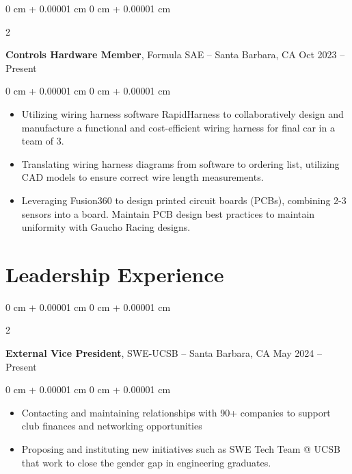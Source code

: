 \documentclass[10pt, letterpaper]{article}
\newenvironment{highlights}{
    \begin{itemize}[
        topsep=0.10 cm,
        parsep=0.10 cm,
        partopsep=0pt,
        itemsep=0pt,
        leftmargin=0 cm + 10pt
    ]
}{
    \end{itemize}
} %
\newenvironment{onecolentry}{
    \begin{adjustwidth}{
        0 cm + 0.00001 cm
    }{
        0 cm + 0.00001 cm
    }
}{
    \end{adjustwidth}
} %
\newenvironment{twocolentry}[2][]{
    \onecolentry
    \def\secondColumn{#2}
    \setcolumnwidth{\fill, 4.5 cm}
    \begin{paracol}{2}
}{
    \switchcolumn \raggedleft \secondColumn
    \end{paracol}
    \endonecolentry
} %
\begin{document}
        \begin{twocolentry}{
            Oct 2023 – Present
        }
            \textbf{Controls Hardware Member}, Formula SAE -- Santa Barbara, CA\end{twocolentry}

        \vspace{0.10 cm}
        \begin{onecolentry}
            \begin{highlights}
                \item Utilizing wiring harness software RapidHarness to collaboratively design and manufacture a functional and cost-efficient wiring harness for final car in a team of 3.
                \item Translating wiring harness diagrams from software to ordering list, utilizing CAD models to ensure correct wire length measurements. 
                \item Leveraging Fusion360 to design printed circuit boards (PCBs), combining 2-3 sensors into a board. Maintain PCB design best practices to maintain uniformity with Gaucho Racing designs.
            \end{highlights}
        \end{onecolentry}


        \vspace{0.2 cm}

    \section{Leadership Experience}

        \begin{twocolentry}{
            May 2024 – Present
        }
            \textbf{External Vice President}, SWE-UCSB -- Santa Barbara, CA\end{twocolentry}

        \vspace{0.10 cm}
        \begin{onecolentry}
            \begin{highlights}
                \item Contacting and maintaining relationships with 90+ companies to support club finances and networking opportunities 
                \item Proposing and instituting new initiatives such as SWE Tech Team @ UCSB that work to close the gender gap in engineering graduates.
            \end{highlights}
        \end{onecolentry}
\end{document}
